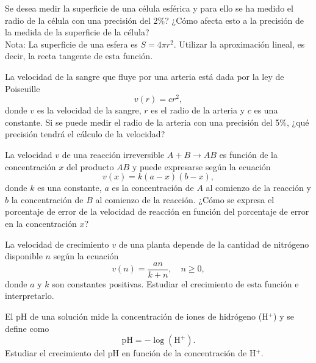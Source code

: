 {Se desea medir la superficie de una célula esférica y para ello se ha medido el radio de la célula con una precisión del 2\%? 
¿Cómo afecta esto a la precisión de la medida de la superficie de la célula?\\
Nota: La superficie de una esfera es $S=4\pi r^2$. Utilizar la aproximación lineal, es decir, la recta tangente de esta función.    
}
{
}
{
}


{La velocidad de la sangre que fluye por una arteria está dada por la ley de Poiseuille
\[
v(r) = cr^2,
\]
donde $v$ es la velocidad de la sangre, $r$ es el radio de la arteria y $c$ es una constante. 
Si se puede medir el radio de la arteria con una precisión del 5\%, ¿qué precisión tendrá el cálculo de la velocidad? 
}
{
}
{
}


{La velocidad $v$ de una reacción irreversible $A+B\rightarrow AB$ es función de la concentración $x$ del producto $AB$ y puede expresarse según la ecuación
\[
v(x) = k(a-x)(b-x),
\]
donde $k$ es una constante, $a$ es la concentración de $A$ al comienzo de la reacción y $b$ la concentración de $B$ al comienzo de la reacción. 
¿Cómo se expresa el porcentaje de error de la velocidad de reacción en función del porcentaje de error en la concentración $x$?
}
{
}
{
}


{La velocidad de crecimiento $v$ de una planta depende de la cantidad de nitrógeno disponible $n$ según la ecuación
\[
v(n) = \frac{an}{k+n},	\quad n\geq 0,
\]
donde $a$ y $k$ son constantes positivas.
Estudiar el crecimiento de esta función e interpretarlo. 
}
{
}
{
}


{El pH de una solución mide la concentración de iones de hidrógeno (H$^+$) y se define como
\[
\mbox{pH} = -\log(\mbox{H}^+).
\]
Estudiar el crecimiento del pH en función de la concentración de H$^+$.
}
{
}
{
}
